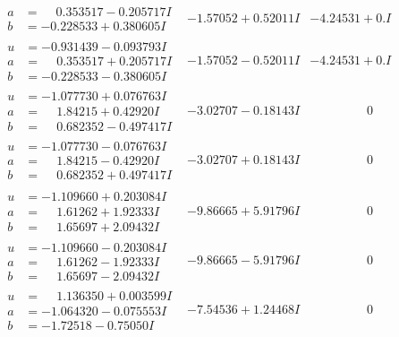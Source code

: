 \documentclass[1p]{elsarticle_modified}
\theoremstyle{definition}
\begin{document}
$$\begin{array}{c|c|c}
\begin{aligned}
a &= \phantom{-}0.353517 - 0.205717 I \\
b &= -0.228533 + 0.380605 I\end{aligned}
 & -1.57052 + 0.52011 I & -4.24531 + 0. I\phantom{ +0.000000I} \\ \hline\begin{aligned}
u &= -0.931439 - 0.093793 I \\
a &= \phantom{-}0.353517 + 0.205717 I \\
b &= -0.228533 - 0.380605 I\end{aligned}
 & -1.57052 - 0.52011 I & -4.24531 + 0. I\phantom{ +0.000000I} \\ \hline\begin{aligned}
u &= -1.077730 + 0.076763 I \\
a &= \phantom{-}1.84215 + 0.42920 I \\
b &= \phantom{-}0.682352 - 0.497417 I\end{aligned}
 & -3.02707 - 0.18143 I & \phantom{-0.000000 } 0 \\ \hline\begin{aligned}
u &= -1.077730 - 0.076763 I \\
a &= \phantom{-}1.84215 - 0.42920 I \\
b &= \phantom{-}0.682352 + 0.497417 I\end{aligned}
 & -3.02707 + 0.18143 I & \phantom{-0.000000 } 0 \\ \hline\begin{aligned}
u &= -1.109660 + 0.203084 I \\
a &= \phantom{-}1.61262 + 1.92333 I \\
b &= \phantom{-}1.65697 + 2.09432 I\end{aligned}
 & -9.86665 + 5.91796 I & \phantom{-0.000000 } 0 \\ \hline\begin{aligned}
u &= -1.109660 - 0.203084 I \\
a &= \phantom{-}1.61262 - 1.92333 I \\
b &= \phantom{-}1.65697 - 2.09432 I\end{aligned}
 & -9.86665 - 5.91796 I & \phantom{-0.000000 } 0 \\ \hline\begin{aligned}
u &= \phantom{-}1.136350 + 0.003599 I \\
a &= -1.064320 - 0.075553 I \\
b &= -1.72518 - 0.75050 I\end{aligned}
 & -7.54536 + 1.24468 I & \phantom{-0.000000 } 0 \\ \hline\begin{aligned}

\end{aligned}
\end{array}$$
\end{document}

